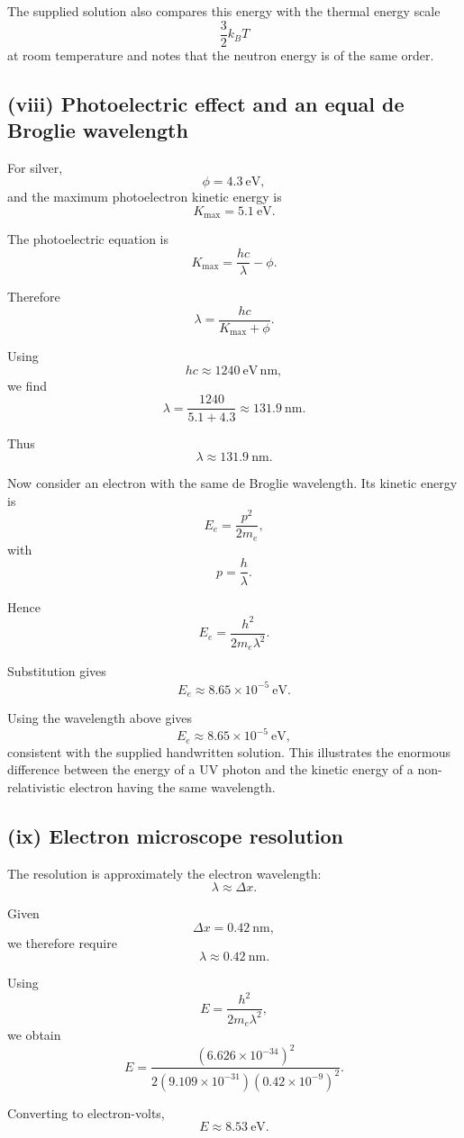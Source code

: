 \documentclass[11pt,a4paper]{article}
\begin{document}
The supplied solution also compares this energy with the thermal energy scale
\[
\frac32k_BT
\]
at room temperature and notes that the neutron energy is of the same order.

\subsection{(viii) Photoelectric effect and an equal de Broglie wavelength}

For silver,
\[
\phi=4.3\ \mathrm{eV},
\]
and the maximum photoelectron kinetic energy is
\[
K_{\max}=5.1\ \mathrm{eV}.
\]

The photoelectric equation is
\[
K_{\max}=\frac{hc}{\lambda}-\phi.
\]

Therefore
\[
\lambda
=
\frac{hc}{K_{\max}+\phi}.
\]

Using
\[
hc\approx1240\ \mathrm{eV\,nm},
\]
we find
\[
\lambda
=
\frac{1240}{5.1+4.3}
\approx131.9\ \mathrm{nm}.
\]

Thus
\[
\boxed{\lambda\approx131.9\ \mathrm{nm}}.
\]

Now consider an electron with the same de Broglie wavelength. Its kinetic energy is
\[
E_e=\frac{p^2}{2m_e},
\]
with
\[
p=\frac h\lambda.
\]

Hence
\[
E_e
=
\frac{h^2}{2m_e\lambda^2}.
\]

Substitution gives
\[
\boxed{E_e\approx8.65\times10^{-5}\ \mathrm{eV}}.
\]

Using the wavelength above gives
\[
E_e\approx8.65\times10^{-5}\ \mathrm{eV},
\]
consistent with the supplied handwritten solution. This illustrates the enormous
difference between the energy of a UV photon and the kinetic energy of a
non-relativistic electron having the same wavelength.

\subsection{(ix) Electron microscope resolution}

The resolution is approximately the electron wavelength:
\[
\lambda\approx\Delta x.
\]

Given
\[
\Delta x=0.42\ \mathrm{nm},
\]
we therefore require
\[
\lambda\approx0.42\ \mathrm{nm}.
\]

Using
\[
E=\frac{h^2}{2m_e\lambda^2},
\]
we obtain
\[
E
=
\frac{(6.626\times10^{-34})^2}
{2(9.109\times10^{-31})(0.42\times10^{-9})^2}.
\]

Converting to electron-volts,
\[
\boxed{E\approx8.53\ \mathrm{eV}}.
\]
\end{document}
